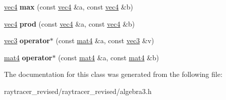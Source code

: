 \begin{DoxyCompactItemize}
\item 
\hypertarget{classvec4_a6e081cda0c56798a7f5510adf7a07c2d}{
\hyperlink{classvec4}{vec4} {\bfseries max} (const \hyperlink{classvec4}{vec4} \&a, const \hyperlink{classvec4}{vec4} \&b)}
\label{classvec4_a6e081cda0c56798a7f5510adf7a07c2d}

\item 
\hypertarget{classvec4_a63ceed040a54841b149af112fe18d491}{
\hyperlink{classvec4}{vec4} {\bfseries prod} (const \hyperlink{classvec4}{vec4} \&a, const \hyperlink{classvec4}{vec4} \&b)}
\label{classvec4_a63ceed040a54841b149af112fe18d491}

\item 
\hypertarget{classvec4_a3a7a7dfc514a58f3c889b48fa4745815}{
\hyperlink{classvec3}{vec3} {\bfseries operator$\ast$} (const \hyperlink{classmat4}{mat4} \&a, const \hyperlink{classvec3}{vec3} \&v)}
\label{classvec4_a3a7a7dfc514a58f3c889b48fa4745815}

\item 
\hypertarget{classvec4_a15e77864e523807c2e4d9172f58cc96b}{
\hyperlink{classmat4}{mat4} {\bfseries operator$\ast$} (const \hyperlink{classmat4}{mat4} \&a, const \hyperlink{classmat4}{mat4} \&b)}
\label{classvec4_a15e77864e523807c2e4d9172f58cc96b}

\end{DoxyCompactItemize}


The documentation for this class was generated from the following file:\begin{DoxyCompactItemize}
\item 
raytracer\_\-revised/raytracer\_\-revised/algebra3.h\end{DoxyCompactItemize}
